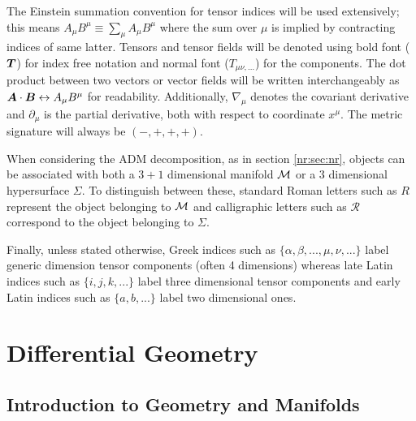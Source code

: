 The Einstein summation convention for tensor indices will be used extensively; this means $A_\mu B^\mu \equiv \sum_{\mu} A_\mu B^\mu$ where the sum over $\mu$ is implied by contracting indices of same latter. Tensors and tensor fields will be denoted using bold font ($\boldsymbol{T}$) for
index free notation and normal font ($T_{\mu\nu,...}$) for the components.
The dot product between two vectors or vector fields will be written interchangeably as $\boldsymbol{A} \cdot \boldsymbol{B} \leftrightarrow {A}_\mu {B}^\mu$ for readability.
Additionally, $\nabla_\mu$ denotes the covariant derivative and $\partial_\mu$
is the partial derivative, both with respect to coordinate $x^\mu$. The metric signature will always be $(-,+,+,+)$.

When considering the ADM decomposition, as in section \ref{nr:sec:nr}, objects can be associated with both a $3+1$ dimensional manifold $\mathcal{M}$ or a $3$ dimensional hypersurface $\Sigma$. To distinguish between these, standard Roman letters such as $R$ represent the object belonging to $\mathcal{M}$ and calligraphic letters such as $\mathcal{R}$ correspond to the object belonging to $\Sigma$.

Finally, unless stated otherwise, Greek indices such
as $\{\alpha, \beta, ..., \mu, \nu, ...\}$ label generic dimension tensor components (often 4 dimensions) whereas late Latin indices such as $\{i, j, k, ...\}$ label
three dimensional tensor components and early Latin indices such as $\{a, b, ...\}$ label two dimensional ones.



\newpage
\section{Differential Geometry}
\subsection{Introduction to Geometry and Manifolds}





